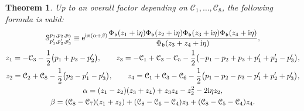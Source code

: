 \documentclass[pdftex]{sigma}
\newcommand{\bb}{{\mathfrak b}}
\newcommand{\e}{{\mathrm e}}
\numberwithin{equation}{section}
\newtheorem{Theorem}{Theorem}[section]
\begin{document}
\begin{Theorem}\label{th:ft}
 Up to an overall factor depending on $\mathcal{C}_1, \dots,
 \mathcal{C}_8$, the following formula is valid:
\begin{gather}%
{\mathcal S}^{p_1,p_2,p_3}_{p'_1,p'_2,p'_3} \equiv
\e^{ {\rm i} \pi(\alpha+\beta)}
\frac{\Phi_{\bb}(z_1+{\rm i}\eta)\Phi_{\bb}(z_2+{\rm i}\eta)\Phi_{\bb}(z_3+{\rm i}\eta)\Phi_{\bb}(z_4+{\rm i}\eta)}
{\Phi_{\bb}(z_3+z_4+{\rm i}\eta)},
\label{S1}\\
z_1 = -{\mathcal C}_3-\frac{1}{2}\bigl(p_1+p_3-p'_2\bigr),\qquad
z_3 = -{\mathcal C}_1+{\mathcal C}_3-{\mathcal C}_5-\frac{1}{2}\bigl(-p_1-p_2+p_3+p'_1+p'_2-p'_3\bigr),\nonumber
\\
z_2= {\mathcal C}_2+{\mathcal C}_8-\frac{1}{2}\bigl(p_2-p'_1-p'_3\bigr),\qquad
z_4 = {\mathcal C}_1+{\mathcal C}_3-{\mathcal C}_6-\frac{1}{2}\bigl(p_1-p_2-p_3-p'_1+p'_2+p'_3\bigr),\nonumber
\\
\alpha = (z_1-z_2)(z_3+z_4)+z_3z_4-z_2^2-2{\rm i}\eta z_2,\nonumber
\\
\beta = ({\mathcal C}_8 - {\mathcal C}_7) (z_1+z_2) + ({\mathcal C}_8-{\mathcal C}_6-{\mathcal C}_4) z_3
+ ({\mathcal C}_8-{\mathcal C}_5-{\mathcal C}_4) z_4.\nonumber
 \end{gather}
\end{Theorem}
\end{document}
